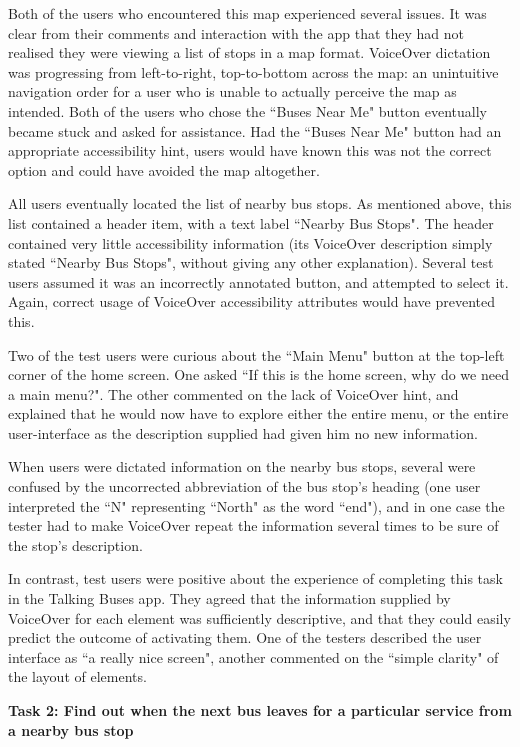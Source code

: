 \documentclass[10pt,twocolumn]{article}
\begin{document}
Both of the users who encountered this map experienced several issues. It was clear from their comments and interaction with the app that they had not realised they were viewing a list of stops in a map format. VoiceOver dictation was progressing from left-to-right, top-to-bottom across the map: an unintuitive navigation order for a user who is unable to actually perceive the map as intended. Both of the users who chose the ``Buses Near Me" button eventually became stuck and asked for assistance. Had the ``Buses Near Me" button had an appropriate accessibility hint, users would have known this was not the correct option and could have avoided the map altogether.

All users eventually located the list of nearby bus stops. As mentioned above, this list contained a header item, with a text label ``Nearby Bus Stops". The header contained very little accessibility information (its VoiceOver description simply stated ``Nearby Bus Stops", without giving any other explanation). Several test users assumed it was an incorrectly annotated button, and attempted to select it. Again, correct usage of VoiceOver accessibility attributes would have prevented this.

Two of the test users were curious about the ``Main Menu" button at the top-left corner of the home screen. One asked ``If this is the home screen, why do we need a main menu?". The other commented on the lack of VoiceOver hint, and explained that he would now have to explore either the entire menu, or the entire user-interface as the description supplied had given him no new information.

When users were dictated information on the nearby bus stops, several were confused by the uncorrected abbreviation of the bus stop's heading (one user interpreted the ``N" representing ``North" as the word ``end"), and in one case the tester had to make VoiceOver repeat the information several times to be sure of the stop's description.

In contrast, test users were positive about the experience of completing this task in the Talking Buses app. They agreed that the information supplied by VoiceOver for each element was sufficiently descriptive, and that they could easily predict the outcome of activating them. One of the testers described the user interface as ``a really nice screen", another commented on the ``simple clarity" of the layout of elements.


\textbf{Task 2: Find out when the next bus leaves for a particular service from a nearby bus stop}
\end{document}
